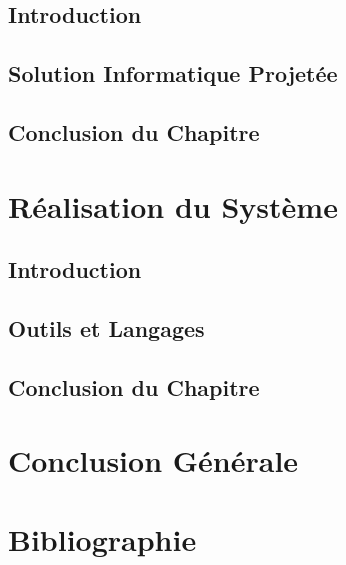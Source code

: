 \documentclass[12pt,a4paper]{report}
\begin{document}
\section*{Introduction}
\section{Solution Informatique Projetée}
\section*{Conclusion du Chapitre}

\chapter{Réalisation du Système}
\section*{Introduction}
\section{Outils et Langages}
\section*{Conclusion du Chapitre}

\chapter*{Conclusion Générale}

\chapter*{Bibliographie}
\end{document}
